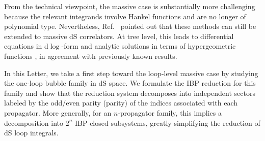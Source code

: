 \documentclass[%
 reprint,
 amsmath,amssymb,
 aps,
prd,
]{revtex4-2}
\def\di{{\mathrm{d}}}
\begin{document}
From the technical viewpoint, the massive case is substantially more challenging because the relevant integrands involve Hankel functions and are no longer of polynomial type. Nevertheless, Ref.~\cite{Chen:2023iix} pointed out that these methods can still be extended to massive dS correlators. At tree level, this leads to differential equations in \(\di\log\)-form and analytic solutions in terms of hypergeometric functions \cite{Chen:2023iix,Chen:2024glu}, in agreement with previously known results.

In this Letter, we take a first step toward the loop-level massive case by studying the one-loop bubble family in dS space. We formulate the IBP reduction for this family and show that the reduction system decomposes into independent sectors labeled by the odd/even parity (parity) of the indices associated with each propagator. More generally, for an \(n\)-propagator family, this implies a decomposition into \(2^n\) IBP-closed subsystems, greatly simplifying the reduction of dS loop integrals.
\end{document}
